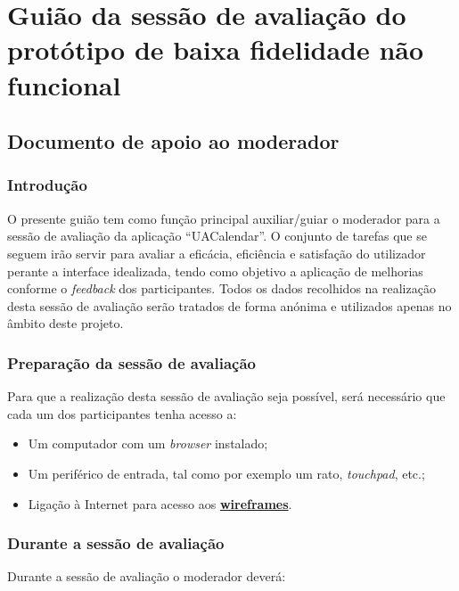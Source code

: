 \documentclass[11pt, twoside]{report}
\begin{document}
		\section*{Guião da sessão de avaliação do protótipo de baixa fidelidade não funcional}
		\subsection*{Documento de apoio ao moderador}
			
		
		\subsubsection*{Introdução}
	O presente guião tem como função principal auxiliar/guiar o moderador para a sessão de avaliação da aplicação “UACalendar”.
	O conjunto de tarefas que se seguem irão servir para avaliar a eficácia, eficiência e satisfação do utilizador perante a interface idealizada, tendo como objetivo a aplicação de melhorias conforme o \textit{feedback} dos participantes.
	Todos os dados recolhidos na realização desta sessão de avaliação serão tratados de forma anónima e utilizados apenas no âmbito deste projeto.
		
		
	\subsubsection*{Preparação da sessão de avaliação}
			Para que a realização desta sessão de avaliação seja possível, será necessário que cada um dos participantes tenha acesso a:
	
	\begin{itemize}
		\item Um computador com um \textit{browser} instalado;
		\item Um periférico de entrada, tal como por exemplo um rato, \textit{touchpad}, etc.;
		\item Ligação à Internet para acesso aos \href{https://www.figma.com/file/nhb5nnIrt3fdDoQhYpsN80/Calendario?node-id=9\%3A154}{\textbf{wireframes}}.
	\end{itemize}

\subsubsection*{Durante a sessão de avaliação}	
Durante a sessão de avaliação o moderador deverá:
\end{document}
